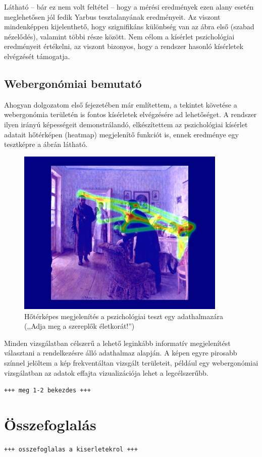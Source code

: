 Látható -- bár ez nem volt feltétel -- hogy a mérési eredmények ezen alany esetén meglehetősen jól fedik Yarbus tesztalanyának eredményeit. Az viszont mindenképpen kijelenthető, hogy szignifikáns különbség van az ábra első (szabad nézelődés), valamint többi része között. Nem célom a kísérlet pszichológiai eredményeit értékelni, az viszont bizonyos, hogy a rendszer hasonló kísérletek elvégzését támogatja.

\subsection{Webergonómiai bemutató}\label{sect:web}

Ahogyan dolgozatom első fejezetében már említettem, a tekintet követése a webergonómia területén is fontos kísérletek elvégzésére ad lehetőséget. A rendszer ilyen irányú képességeit demonstrálandó, elkészítettem az pszichológiai kísérlet adatait hőtérképen (heatmap) megjelenítő funkciót is, ennek eredménye egy tesztképre a  ábrán látható.

\begin{figure}[!ht]
\centering
\includegraphics[width=100mm, keepaspectratio]{figures/heatmap.jpg}
\caption{Hőtérképes megjelenítés a pszichológiai teszt egy adathalmazára (,,Adja meg a szereplők életkorát!'')}
\label{fig:heatmap}
\end{figure}

Minden vizsgálatban célszerű a lehető leginkább informatív megjelenítést választani a rendelkezésre álló adathalmaz alapján. A képen egyre pirosabb színnel jelöltem a kép frekventáltan vizsgált területeit, például egy webergonómiai vizsgálatban az adatok effajta vizualizációja lehet a legcélszerűbb.

\bigskip

\texttt{+++ meg 1-2 bekezdes +++}

\section{Összefoglalás}\label{sect:kiserlet_osszefoglalas}

\texttt{+++ osszefoglalas a kiserletekrol +++}